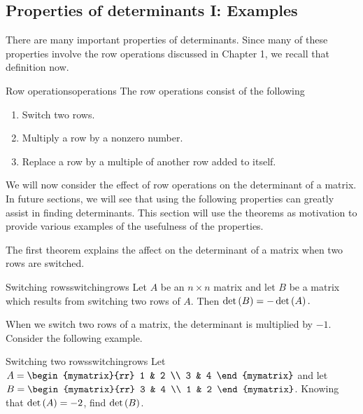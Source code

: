 \subsection{Properties of determinants I: Examples}

There are many important properties of determinants. Since many of these properties involve
the row operations discussed in Chapter 1, we recall that definition now. 

\begin{definition}{Row operations}{operations}
The row operations
consist of the following

\begin{enumerate}
\item Switch two rows.

\item Multiply a row by a nonzero number.

\item Replace a row by a multiple of another row added to itself.
\end{enumerate}
\end{definition}

We will now consider the effect of row operations on the determinant of a matrix. In future sections, we will see that using the following properties can 
greatly assist in finding determinants. This section will use the theorems as motivation to provide various examples of the usefulness of the properties. 

The first theorem explains the affect on the determinant of a matrix when two rows are switched. 

\begin{theorem}{Switching rows}{switchingrows}
Let $A$ be an $n\times n$ matrix and let $B$ be a matrix
which results from switching two rows of $A.$ Then $\det \left(B\right)
= - \det \left(A\right) .$ 
\end{theorem}

When we switch two rows of a matrix, the determinant is multiplied by $-1$. Consider the following example.

\begin{example}{Switching two rows}{switchingrows}
Let $A=\begin{mymatrix}{rr}
1 & 2 \\
3 & 4
\end{mymatrix} $ and let $B=\begin{mymatrix}{rr}
3 & 4 \\
1 & 2
\end{mymatrix} $. 
Knowing that $\det \left(A \right) =-2$, find $\det \left(B \right) $.
\end{example}

